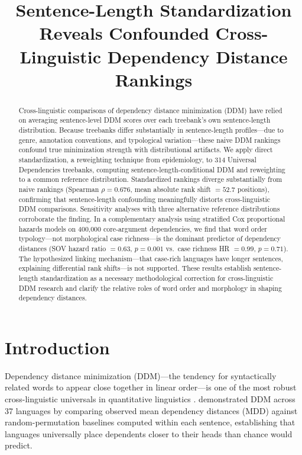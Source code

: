 \documentclass[11pt,letterpaper]{article}
\title{Sentence-Length Standardization Reveals Confounded Cross-Linguistic Dependency Distance Rankings}
\author{}
\date{}
\begin{document}
\maketitle

\begin{abstract}
Cross-linguistic comparisons of dependency distance minimization (DDM) have relied on averaging sentence-level DDM scores over each treebank's own sentence-length distribution. Because treebanks differ substantially in sentence-length profiles---due to genre, annotation conventions, and typological variation---these naive DDM rankings confound true minimization strength with distributional artifacts. We apply direct standardization, a reweighting technique from epidemiology, to 314 Universal Dependencies treebanks, computing sentence-length-conditional DDM and reweighting to a common reference distribution. Standardized rankings diverge substantially from naive rankings (Spearman $\rho = 0.676$, mean absolute rank shift $= 52.7$ positions), confirming that sentence-length confounding meaningfully distorts cross-linguistic DDM comparisons. Sensitivity analyses with three alternative reference distributions corroborate the finding. In a complementary analysis using stratified Cox proportional hazards models on 400,000 core-argument dependencies, we find that word order typology---not morphological case richness---is the dominant predictor of dependency distances (SOV hazard ratio $= 0.63$, $p = 0.001$ vs.\ case richness HR $= 0.99$, $p = 0.71$). The hypothesized linking mechanism---that case-rich languages have longer sentences, explaining differential rank shifts---is not supported. These results establish sentence-length standardization as a necessary methodological correction for cross-linguistic DDM research and clarify the relative roles of word order and morphology in shaping dependency distances.
\end{abstract}

\section{Introduction}

Dependency distance minimization (DDM)---the tendency for syntactically related words to appear close together in linear order---is one of the most robust cross-linguistic universals in quantitative linguistics \citep{Futrell2015, Liu2017}. \citet{Futrell2015} demonstrated DDM across 37 languages by comparing observed mean dependency distances (MDD) against random-permutation baselines computed within each sentence, establishing that languages universally place dependents closer to their heads than chance would predict.
\end{document}
